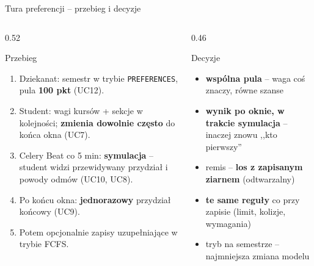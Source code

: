 \documentclass[aspectratio=169, 10pt, xcolor=table]{beamer}
\begin{document}
\begin{frame}{Tura preferencji -- przebieg i decyzje}
    \footnotesize
    \begin{columns}[T, onlytextwidth]
        \begin{column}{0.52\textwidth}
            \begin{block}{Przebieg}
                \begin{enumerate}
                    \item Dziekanat: semestr w trybie \texttt{PREFERENCES}, pula \textbf{100 pkt} (UC12).
                    \item Student: wagi kursów + sekcje w kolejności; \textbf{zmienia dowolnie często} do końca okna (UC7).
                    \item Celery Beat co 5 min: \textbf{symulacja} -- student widzi przewidywany przydział i powody odmów (UC10, UC8).
                    \item Po końcu okna: \textbf{jednorazowy} przydział końcowy (UC9).
                    \item Potem opcjonalnie zapisy uzupełniające w trybie FCFS.
                \end{enumerate}
            \end{block}
        \end{column}
        \begin{column}{0.46\textwidth}
            \begin{exampleblock}{Decyzje}
                \begin{itemize}
                    \item \textbf{wspólna pula} -- waga coś znaczy, równe szanse
                    \item \textbf{wynik po oknie, w trakcie symulacja} -- inaczej znowu ,,kto pierwszy''
                    \item remis -- \textbf{los z zapisanym ziarnem} (odtwarzalny)
                    \item \textbf{te same reguły} co przy zapisie (limit, kolizje, wymagania)
                    \item tryb na semestrze -- najmniejsza zmiana modelu
                \end{itemize}
            \end{exampleblock}
        \end{column}
    \end{columns}
\end{frame}
\end{document}
